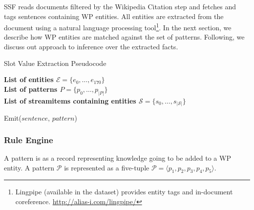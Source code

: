 SSF reads documents filtered by the Wikipedia Citation step and fetches and tags sentences containing WP entities.
All entities are extracted from the document using a natural language processing
tool\footnote{Lingpipe (available in the dataset) provides entity tags
and in-document coreference. \url{http://alias-i.com/lingpipe/}}.
In the next section, we describe how WP entities are matched against the set of patterns.
Following, we discuss out approach to inference over the extracted facts.

\begin{algorithm}
  \caption{Slot Value Extraction Pseudocode}
  \textbf{List of entities $\mathcal{E} = \{e_0, \ldots, e_{170}\}$}\\
  \textbf{List of patterns $P = \{p_0, \ldots, p_{|P|}\}$}\\
  \textbf{List of streamitems containing entities $\mathcal{S} = \{s_0, \ldots, s_{|\mathcal{S}|}\}$}\\
  
  \begin{algorithmic}%
                \STATE Emit($sentence$, $pattern$)
              \ENDIF
	    \ENDFOR
          \ENDIF
        \ENDFOR
      \ENDFOR
    \ENDFOR
  \end{algorithmic}
\end{algorithm}


\subsubsection{Rule Engine}

A pattern is as a record representing knowledge going to be added to a WP entity.
A pattern $\mathcal{P}$ is represented as a five-tuple $\mathcal{P} = \langle p_1, p_2, p_3, p_4, p_5 \rangle$.


